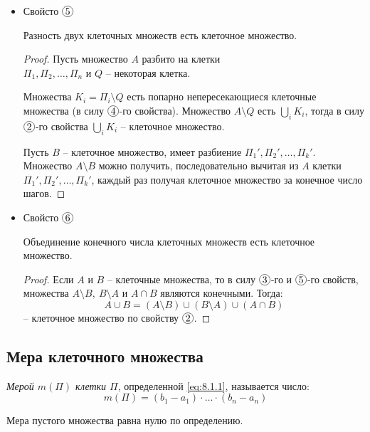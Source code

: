 \begin{itemize}
    \item Свойсто $ \circled{5} $
          \begin{statement}
              Разность двух клеточных множеств есть клеточное множество.
          \end{statement}
          \begin{proof}
              Пусть множество $A$ разбито на клетки \\ $\Pi_1,\Pi_2,\ldots,\Pi_n$ и $Q$ -- некоторая клетка.

              Множества $K_i = \Pi_i \setminus Q$ есть попарно непересекающиеся клеточные множества (в силу $ \circled{4} $-го свойства). Множество $A\setminus Q$ есть $\underset{i}{\bigcup}K_i$, тогда в силу $ \circled{2} $-го свойства $\underset{i}{\bigcup}K_i$ -- клеточное множество.

              Пусть $B$ -- клеточное множество, имеет разбиение $\Pi_1',\Pi_2',\ldots,\Pi_k'$. Множество $A\setminus B$ можно получить, последовательно вычитая из $A$ клетки $\Pi_1',\Pi_2',\ldots,\Pi_k'$, каждый раз получая клеточное множество за конечное число шагов.
          \end{proof}

    \item Свойсто $ \circled{6} $
          \begin{statement}
              Объединение конечного числа клеточных множеств есть клеточное множество.
          \end{statement}
          \begin{proof}
              Если $A$ и $B$ -- клеточные множества, то в силу $ \circled{3} $-го и $ \circled{5} $-го свойств, множества $A\setminus B, \ B \setminus A$ и $A \cap B$ являются конечными. Тогда:
              \[
                  A \cup B = (A\setminus B) \cup (B \setminus A) \cup(A \cap B)
              \]
              -- клеточное множество по свойству $ \circled{2} $.
          \end{proof}
\end{itemize}

\subsection{Мера клеточного множества}

\begin{definition}
    \emph{Мерой $m(\Pi)$ клетки $\Pi$}, определенной \ref{eq:8.1.1}, называется число:
    \begin{equation}\label{eq:8.1.2}
        m(\Pi) = (b_1 - a_1)\cdot \ldots \cdot (b_n - a_n)
    \end{equation}

    Мера пустого множества равна нулю по определению.
\end{definition}

